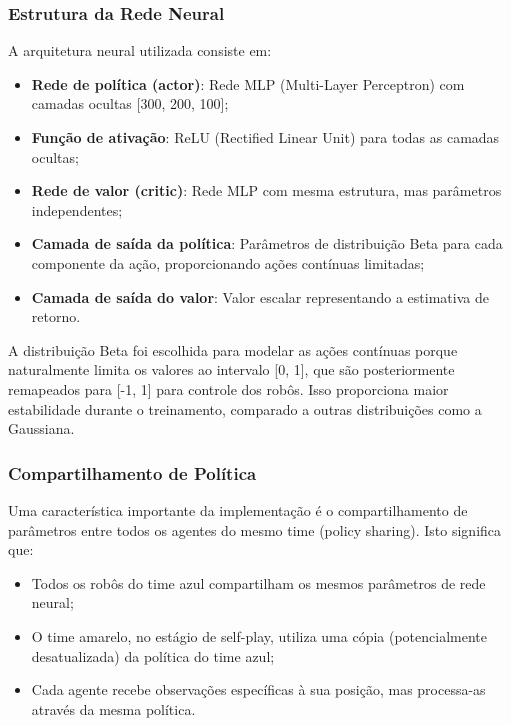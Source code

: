 \subsubsection{Estrutura da Rede Neural}

A arquitetura neural utilizada consiste em:

\begin{itemize}
    \item \textbf{Rede de política (actor)}: Rede MLP (Multi-Layer Perceptron) com camadas ocultas [300, 200, 100];
    \item \textbf{Função de ativação}: ReLU (Rectified Linear Unit) para todas as camadas ocultas;
    \item \textbf{Rede de valor (critic)}: Rede MLP com mesma estrutura, mas parâmetros independentes;
    \item \textbf{Camada de saída da política}: Parâmetros de distribuição Beta para cada componente da ação, proporcionando ações contínuas limitadas;
    \item \textbf{Camada de saída do valor}: Valor escalar representando a estimativa de retorno.
\end{itemize}

A distribuição Beta foi escolhida para modelar as ações contínuas porque naturalmente limita os valores ao intervalo [0, 1], que são posteriormente remapeados para [-1, 1] para controle dos robôs. Isso proporciona maior estabilidade durante o treinamento, comparado a outras distribuições como a Gaussiana.

\subsubsection{Compartilhamento de Política}

Uma característica importante da implementação é o compartilhamento de parâmetros entre todos os agentes do mesmo time (policy sharing). Isto significa que:

\begin{itemize}
    \item Todos os robôs do time azul compartilham os mesmos parâmetros de rede neural;
    \item O time amarelo, no estágio de self-play, utiliza uma cópia (potencialmente desatualizada) da política do time azul;
    \item Cada agente recebe observações específicas à sua posição, mas processa-as através da mesma política.
\end{itemize}

